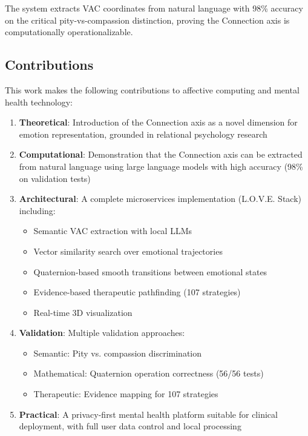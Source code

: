The system extracts VAC coordinates from natural language with 98\% accuracy on the critical pity-vs-compassion distinction, proving the Connection axis is computationally operationalizable.

\subsection{Contributions}

This work makes the following contributions to affective computing and mental health technology:

\begin{enumerate}
    \item \textbf{Theoretical}: Introduction of the Connection axis as a novel dimension for emotion representation, grounded in relational psychology research

    \item \textbf{Computational}: Demonstration that the Connection axis can be extracted from natural language using large language models with high accuracy (98\% on validation tests)

    \item \textbf{Architectural}: A complete microservices implementation (L.O.V.E. Stack) including:
    \begin{itemize}
        \item Semantic VAC extraction with local LLMs
        \item Vector similarity search over emotional trajectories
        \item Quaternion-based smooth transitions between emotional states
        \item Evidence-based therapeutic pathfinding (107 strategies)
        \item Real-time 3D visualization
    \end{itemize}

    \item \textbf{Validation}: Multiple validation approaches:
    \begin{itemize}
        \item Semantic: Pity vs. compassion discrimination
        \item Mathematical: Quaternion operation correctness (56/56 tests)
        \item Therapeutic: Evidence mapping for 107 strategies
    \end{itemize}

    \item \textbf{Practical}: A privacy-first mental health platform suitable for clinical deployment, with full user data control and local processing
\end{enumerate}

